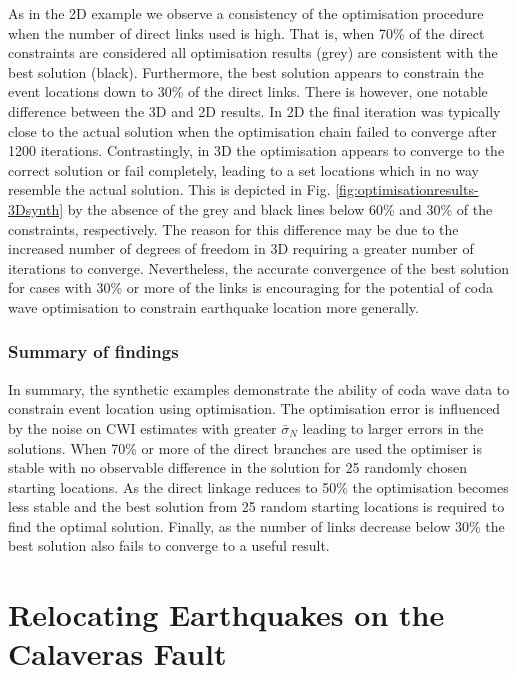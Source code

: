 \documentclass[extra]{gji}
\begin{document}
As in the 2D example we observe a consistency of the optimisation procedure when the number of direct links used
is high. That is, when 70\% of the direct constraints are considered all optimisation results (grey) are consistent with
the best solution (black). Furthermore, the best solution appears to constrain the event locations down to 30\%
of the direct links. There is however, one notable difference between the 3D and 2D results.
In 2D the final iteration was typically close to the actual solution
when the optimisation chain failed to converge after 1200 iterations. Contrastingly,
in 3D the optimisation appears to converge to the correct solution or fail completely, leading to a set locations which
in no way resemble the actual solution. This is depicted in Fig. \ref{fig:optimisationresults-3Dsynth}
by the absence of the grey and black lines below 60\% and 30\% of the constraints, respectively.
The reason for this difference may be due to the increased number of degrees
of freedom in 3D requiring a greater number of iterations to converge. Nevertheless, the accurate convergence of the best
solution for cases with 30\% or more of the links is encouraging for the potential
of coda wave optimisation to constrain earthquake location more generally.

\subsubsection{Summary of findings}

In summary, the synthetic examples demonstrate the ability of coda wave data to constrain event location
using optimisation. The optimisation error is influenced by the
noise on CWI estimates with greater $\bar{\sigma}_N$ leading to larger
errors in the solutions. When 70\% or more of the direct branches are used the
optimiser is stable with no observable difference in the solution for 25 randomly chosen starting
locations. As the direct linkage reduces to 50\% the optimisation becomes less stable and the best solution
from 25 random starting locations is required to find the optimal solution. Finally, as the number of links decrease
below 30\% the best solution also fails to converge to a useful result.


\section{Relocating Earthquakes on the Calaveras Fault}
\label{sec:CalaverasLoc-CWIonly}
\end{document}
